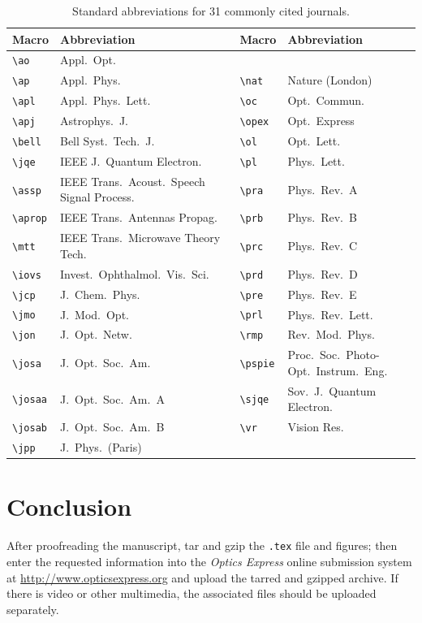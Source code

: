 \documentclass[10pt,letterpaper]{article}
\begin{document}
\begin{table}[htb]
\centering\caption{Standard abbreviations
 for 31 commonly cited journals.}
\begin{tabular}{lp{1.7in}|lp{1.7in}}
\hline 
Macro & Abbreviation & Macro & Abbreviation \\ \hline
\verb+\ao+ & Appl.\  Opt.\     \\
\verb+\ap+ & Appl.\  Phys.\  & \verb+\nat+ & Nature (London)   \\
\verb+\apl+ & Appl.\ Phys.\ Lett.\
  & \verb+\oc+ & Opt.\ Commun.\  \\
\verb+\apj+ & Astrophys.\ J.\  & \verb+\opex+ & Opt.\ Express    \\
\verb+\bell+ & Bell Syst.\ Tech.\ J.\
  & \verb+\ol+ & Opt.\ Lett.\   \\
\verb+\jqe+ & IEEE J.\ Quantum Electron.\
  & \verb+\pl+ & Phys.\ Lett.\   \\
\verb+\assp+ & IEEE Trans.\ Acoust.\ Speech Signal Process.\
  & \verb+\pra+ & Phys.\ Rev.\ A   \\
\verb+\aprop+ & IEEE Trans.\  Antennas Propag.\ 
  & \verb+\prb+ & Phys.\ Rev.\ B   \\
\verb+\mtt+ & IEEE Trans.\ Microwave Theory Tech.\
  & \verb+\prc+ & Phys.\ Rev.\ C   \\
\verb+\iovs+ & Invest.\ Ophthalmol.\ Vis.\ Sci.\
  & \verb+\prd+ & Phys.\ Rev.\ D   \\
\verb+\jcp+ & J.\ Chem.\ Phys.\
  & \verb+\pre+ & Phys.\ Rev.\ E   \\
\verb+\jmo+ & J.\ Mod.\ Opt.\
  & \verb+\prl+ & Phys.\ Rev.\ Lett.\    \\
\verb+\jon+ & J.\ Opt.\ Netw.\ 
  & \verb+\rmp+ & Rev.\ Mod.\ Phys.\    \\
\verb+\josa+ & J.\ Opt.\ Soc.\ Am.\  
  & \verb+\pspie+ & Proc.\ Soc.\ Photo-Opt.\ Instrum.\ Eng.\   \\
\verb+\josaa+ & J.\ Opt.\ Soc.\ Am.\ A 
  & \verb+\sjqe+ & Sov.\ J.\ Quantum Electron.\   \\
\verb+\josab+ & J.\ Opt.\ Soc.\ Am.\ B
  & \verb+\vr+ & Vision Res.\   \\
\verb+\jpp+ & J.\ Phys.\ (Paris)  & &  \\ \hline
\end{tabular}
\end{table}

\section{Conclusion}
After proofreading the manuscript, tar and gzip the \texttt{.tex} file and
figures; then enter the requested information into the \textit{Optics Express}
online submission system at \url{http://www.opticsexpress.org} and upload the tarred and gzipped archive. If there is video or other multimedia, the associated files should be uploaded separately.
\end{document}
